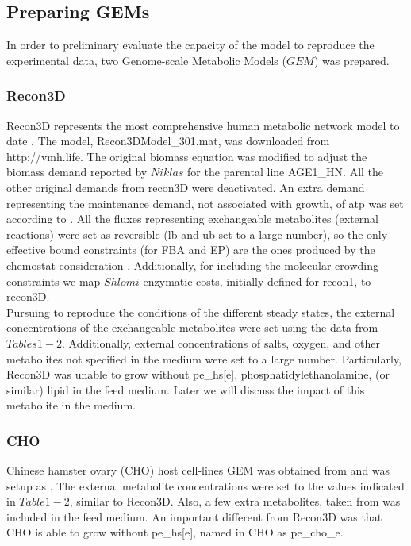 \documentclass[]{article}
\begin{document}
	\subsection{Preparing GEMs} %
	
	In order to preliminary evaluate the capacity of the model to reproduce the experimental data, two Genome-scale Metabolic Models ($GEM$) was prepared.
	
	\subsubsection{Recon3D}
	
	Recon3D represents the most comprehensive human metabolic network model to date \cite{Brunk2018}. The model,
	Recon3DModel\_301.mat, was downloaded from http://vmh.life. The original biomass equation was modified to adjust the biomass demand reported by $Niklas$ for the parental line AGE1\_HN. All the other original demands from recon3D were deactivated. An extra demand representing the maintenance demand, not associated with growth, of atp was set according to \cite{Fernandez-de-Cossio-Diaz2018b}. All the fluxes representing exchangeable metabolites (external reactions) were set as reversible (lb and ub set to a large number), so the only effective bound constraints (for FBA and EP) are the ones produced by the chemostat consideration \cite{Fernandez-de-Cossio-Diaz2018b}. Additionally, for including the molecular crowding constraints we map $Shlomi$ enzymatic costs, initially defined for recon1, to recon3D.\\
	Pursuing to reproduce the conditions of the different steady states, the external concentrations of the exchangeable metabolites were set using the data from $Tables 1-2$. Additionally, external concentrations of salts, oxygen, and other metabolites not specified in the medium were set to a large number. Particularly, Recon3D was unable to grow without pe\_hs[e], phosphatidylethanolamine, (or similar) lipid in the feed medium. Later we will discuss the impact of this metabolite in the medium.  
	
	\subsubsection{CHO}
	
	Chinese hamster ovary (CHO) host cell-lines GEM was obtained from \cite{Hefzi2016a} and was setup as \cite{Fernandez-de-Cossio-Diaz2018b}.  The external metabolite concentrations were set to the values indicated in $Table 1-2$, similar to Recon3D. Also, a few extra metabolites, taken from \cite{Fernandez-de-Cossio-Diaz2018b} was included in the feed medium. An important different from Recon3D was that CHO is able to grow without pe\_hs[e], named in CHO as pe\_cho\_e. 
	
\end{document}
